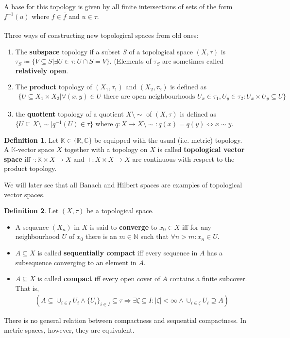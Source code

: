\documentclass[10pt,a4paper]{article}
\theoremstyle{definition}
\newtheorem{definition}{Definition}
\theoremstyle{cor}
\theoremstyle{theorem}
\theoremstyle{lemma}
\theoremstyle{example}
\begin{document}
\\\\
A base for this topology is given by all finite intersections of sets of the form $f^{-1}(u)$ where $f\in\overline{f}$ and $u\in\tau$.
\\\\
Three ways of constructing new topological spaces from old ones:
\begin{enumerate}
\item The \textbf{subspace} topology if a subset $S$ of a topological space $(X, \tau)$ is $\tau_S \coloneqq \{ V\subseteq S | \exists U \in \tau : U \cap S = V\}$. (Elements  of $\tau_S$ are sometimes called \textbf{relatively open}.
\item The \textbf{product} topology of $(X_1, \tau_1)$ and $(X_2, \tau_2)$ is defined as
\begin{align*}
 \{ U \subseteq X_1 \times X_2 | \forall(x, y)\in U \text{ there are open neighbourhoods } U_x \in \tau_1, U_y \in \tau_2 : U_x \times U_y \subseteq U \}
\end{align*}
\item the \textbf{quotient} topology of a quotient $X \setminus \sim$ of $(X, \tau)$ is defined as $\{ U \subseteq X \setminus \sim  | q^{-1}(U) \in \tau \}$ where $q:X \rightarrow X\setminus \sim : q(x) = q(y) \Leftrightarrow x \sim y$.
\end{enumerate}
\begin{definition}
Let $\mathbb{K}\in\{\mathbb{R}, \mathbb{C}\}$ be equipped with the usual (i.e. metric) topology. A $\mathbb{K}$-vector space $X$ together with a topology on $X$ is called \textbf{topological vector space} iff $\cdot : \mathbb{K} \times X \rightarrow X$ and $+ : X\times X \rightarrow X$ are continuous with respect to the product topology. 
\end{definition}

\noindent We will later see that all Banach and Hilbert spaces are examples of topological vector spaces.

\begin{definition}
Let $(X,\tau)$ be a topological space.
\begin{itemize}
\item A sequence $(X_n)$ in $X$ is said to \textbf{converge} to $x_0\in X$ iff for any neighbourhood $U$ of $x_0$ there is an $m\in \mathbb{N}$ such that  $\forall n > m : x_n \in U$.
\item $A \subseteq X$ is called \textbf{sequentially compact} iff every sequence in $A$ has a subsequence converging to an element in $A$.
\item $A \subseteq X $ is called \textbf{compact} iff every open cover of $A$ contains a finite subcover. That is, 
\begin{align*}
\left(A \subseteq \cup_{i \in I} U_i \wedge \{U_i\}_{i\in I} \subseteq \tau \Rightarrow \exists \zeta \subseteq I : |\zeta| < \infty \wedge \cup_{i\in \zeta} U_{i} \supseteq A\right)
\end{align*}
\end{itemize}
\end{definition}
\noindent There is no general relation between compactness and sequential compactness. In metric spaces, however, they are equivalent. 
\end{document}
